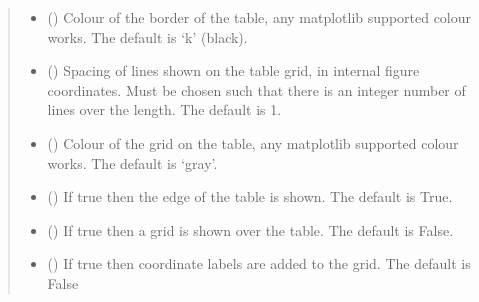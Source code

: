 \documentclass[letterpaper,10pt,english]{sphinxmanual}
\begin{document}
\begin{fulllineitems}
\begin{quote}
\begin{description}
\begin{itemize}
\item {} 
\sphinxAtStartPar
{} (\sphinxstyleliteralemphasis{\sphinxupquote{, }}) \textendash{} Colour of the border of the table, any matplotlib supported colour
works. The default is ‘k’ (black).

\item {} 
\sphinxAtStartPar
{} (\sphinxstyleliteralemphasis{\sphinxupquote{, }}) \textendash{} Spacing of lines shown on the table grid, in internal figure coordinates.
Must be chosen such that there is an integer number of lines over the length. The default is 1.

\item {} 
\sphinxAtStartPar
{} (\sphinxstyleliteralemphasis{\sphinxupquote{, }}) \textendash{} Colour of the grid on the table, any matplotlib supported colour
works. The default is ‘gray’.

\item {} 
\sphinxAtStartPar
{} (\sphinxstyleliteralemphasis{\sphinxupquote{, }}) \textendash{} If true then the edge of the table is shown. The default is True.

\item {} 
\sphinxAtStartPar
{} (\sphinxstyleliteralemphasis{\sphinxupquote{, }}) \textendash{} If true then a grid is shown over the table. The default is False.

\item {} 
\sphinxAtStartPar
{} (\sphinxstyleliteralemphasis{\sphinxupquote{, }}) \textendash{} If true then coordinate labels are added to the grid. The default
is False

\end{itemize}


\end{description}
\end{quote}
\end{fulllineitems}
\end{document}
